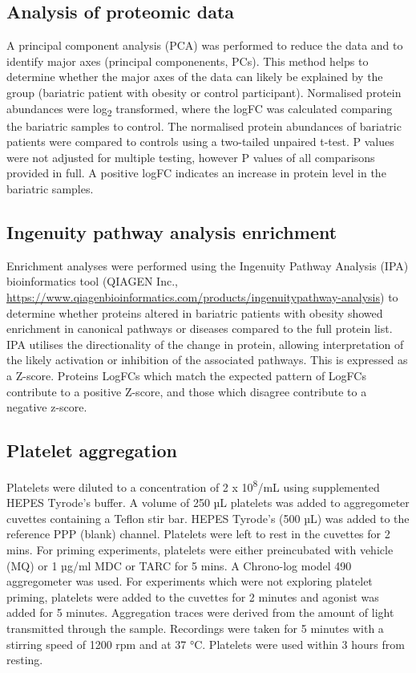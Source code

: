 \documentclass[11pt,twoside]{bristolthesis}
\begin{document}
\hypertarget{analysis-of-proteomic-data}{%
\subsection{Analysis of proteomic data}\label{analysis-of-proteomic-data}}

A principal component analysis (PCA) was performed to reduce the data and to identify major axes (principal componenents, PCs). This method helps to determine whether the major axes of the data can likely be explained by the group (bariatric patient with obesity or control participant). Normalised protein abundances were log\textsubscript{2} transformed, where the logFC was calculated comparing the bariatric samples to control. The normalised protein abundances of bariatric patients were compared to controls using a two-tailed unpaired t-test. P values were not adjusted for multiple testing, however P values of all comparisons provided in full. A positive logFC indicates an increase in protein level in the bariatric samples.

\hypertarget{ingenuity-pathway-analysis-enrichment}{%
\subsection{Ingenuity pathway analysis enrichment}\label{ingenuity-pathway-analysis-enrichment}}

Enrichment analyses were performed using the Ingenuity Pathway Analysis (IPA) bioinformatics tool (QIAGEN Inc., \url{https://www.qiagenbioinformatics.com/products/ingenuitypathway-analysis}) to determine whether proteins altered in bariatric patients with obesity showed enrichment in canonical pathways or diseases compared to the full protein list. IPA utilises the directionality of the change in protein, allowing interpretation of the likely activation or inhibition of the associated pathways. This is expressed as a Z-score. Proteins LogFCs which match the expected pattern of LogFCs contribute to a positive Z-score, and those which disagree contribute to a negative z-score.

\hypertarget{platelet-aggregation}{%
\subsection{Platelet aggregation}\label{platelet-aggregation}}

Platelets were diluted to a concentration of 2 x 10\textsuperscript{8}/mL using supplemented HEPES Tyrode's buffer. A volume of 250 µL platelets was added to aggregometer cuvettes containing a Teflon stir bar. HEPES Tyrode's (500 µL) was added to the reference PPP (blank) channel. Platelets were left to rest in the cuvettes for 2 mins. For priming experiments, platelets were either preincubated with vehicle (MQ) or 1 µg/ml MDC or TARC for 5 mins. A Chrono-log model 490 aggregometer was used. For experiments which were not exploring platelet priming, platelets were added to the cuvettes for 2 minutes and agonist was added for 5 minutes. Aggregation traces were derived from the amount of light transmitted through the sample. Recordings were taken for 5 minutes with a stirring speed of 1200 rpm and at 37 °C. Platelets were used within 3 hours from resting.
\end{document}
